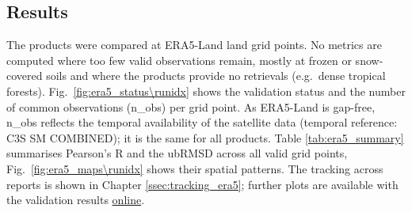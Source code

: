\subsection{Results} \label{ssec:era5_results}

\noindent The products were compared at \textbf{} ERA5-Land land grid points.
No metrics are computed where too few valid observations remain, mostly at frozen or snow-covered soils and where the products provide no retrievals (e.g.\ dense tropical forests).
Fig.\ \ref{fig:era5_status\runidx} shows the validation status and the number of common observations (n\_obs) per grid point.
As ERA5-Land is gap-free, n\_obs reflects the temporal availability of the satellite data (temporal reference: \ac{C3S} SM COMBINED); it is the same for all products.
Table \ref{tab:era5_summary} summarises Pearson's R and the \ac{ubRMSD} across all valid grid points, Fig.\ \ref{fig:era5_maps\runidx} shows their spatial patterns.
The tracking across reports is shown in Chapter \ref{ssec:tracking_era5}; further plots are available with the validation results \href{\detokenize{$<ContentVars['NetcdfMetaVars']['url']>$}}{online}.

